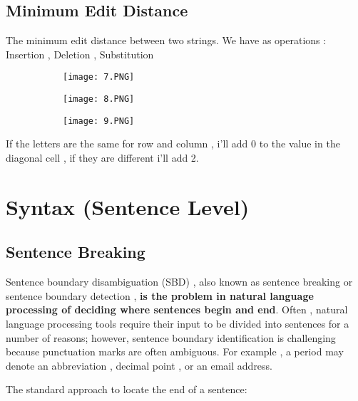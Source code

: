 \documentclass{article}
\begin{document}
\vspace{20mm}

\subsection{Minimum Edit Distance}

The minimum edit distance between two strings.
We have as operations : Insertion , Deletion , Substitution


\begin{figure}[ht!]
  \centering
  \begin{subfigure}[b]{0.4\linewidth}
    \texttt{[image: 7.PNG]}
  \end{subfigure}
     \begin{subfigure}[b]{0.59\textwidth}
         \centering
         \texttt{[image: 8.PNG]}
     \end{subfigure}
\end{figure}

\begin{figure}[ht!]
  \centering
  \begin{subfigure}[b]{1\linewidth}
    \texttt{[image: 9.PNG]}
  \end{subfigure}
\end{figure}

If the letters are the same for row and column , i'll add 0 to the value in the diagonal cell , if they are different i'll add 2.

\section{Syntax (Sentence Level)}

\subsection{Sentence Breaking}

Sentence boundary disambiguation (SBD) , also known as sentence breaking or sentence boundary detection , \textbf{is the problem in natural language processing of deciding where sentences begin and end}. Often , natural language processing tools require their input to be divided into sentences for a number of reasons; however, sentence boundary identification is challenging because punctuation marks are often ambiguous. For example , a period may denote an abbreviation , decimal point , or an email address.

The standard approach to locate the end of a sentence: 
\end{document}
